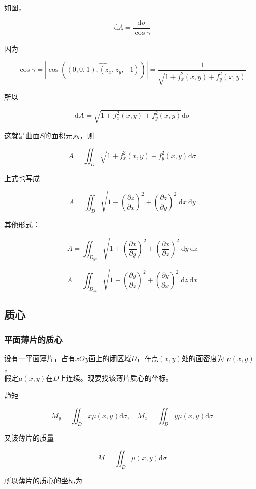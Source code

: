 \documentclass[12pt, a4paper]{article}
\numberwithin{equation}{section}
\newcommand{\rmd}{\mathrm{d}}
\begin{document}
    如图，

    \[
        \rmd A = \frac{\rmd \sigma}{\cos \gamma}
    \]

    因为

    $$
        \cos \gamma = \left|\cos\left(\widehat{\left(0,0,1\right), \left(z_x,z_y,-1\right)}\right)\right|
        = \frac{1}{\sqrt{1+f_x^2(x, y)+f_y^2(x, y)}}
    $$

    所以

    \[
        \rmd A = \sqrt{1+f_x^2(x, y)+f_y^2(x, y)} \rmd \sigma
    \]

    这就是曲面\(S\)的面积元素，则

    $$
        A=\iint_D \sqrt{1+f_x^2(x, y)+f_y^2(x, y)} \mathrm{d} \sigma
    $$

    上式也写成

    $$
        A=\iint_D \sqrt{1+\left(\frac{\partial z}{\partial x}\right)^2+\left(\frac{\partial z}{\partial y}\right)^2} \mathrm{~d} x \mathrm{~d} y
    $$

    其他形式：

    $$
        A=\iint_{D_{yz}} \sqrt{1+\left(\frac{\partial x}{\partial y}\right)^2+\left(\frac{\partial x}{\partial z}\right)^2} \mathrm{~d} y \mathrm{~d} z
    $$

    $$
        A=\iint_{D_{zx}} \sqrt{1+\left(\frac{\partial y}{\partial z}\right)^2+\left(\frac{\partial y}{\partial x}\right)^2} \mathrm{~d} z \mathrm{~d} x
    $$

\subsection{质心}

\subsubsection{平面薄片的质心}

    设有一平面薄片，占有\(xOy\)面上的闭区域\(D\)，在点\(\left(x,y\right)\)处的面密度为
    \(\mu\left(x,y\right)\)，\\假定\(\mu\left(x,y\right)\)在\(D\)上连续。现要找该薄片质心的坐标。

    静矩

    $$
        M_y=\iint_D x \mu(x, y) \mathrm{d} \sigma, \quad M_x=\iint_D y \mu(x, y) \mathrm{d} \sigma
    $$

    又该薄片的质量

    $$
        M=\iint_D \mu(x, y) \mathrm{d} \sigma
    $$

    所以薄片的质心的坐标为
\end{document}
